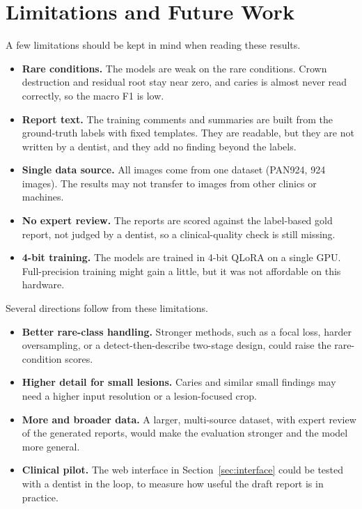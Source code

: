 \documentclass[a4paper,12pt]{report}
\begin{document}
\section{Limitations and Future Work}

A few limitations should be kept in mind when reading these results.

\begin{itemize}
    \item \textbf{Rare conditions.} The models are weak on the rare conditions. Crown destruction and residual root stay near zero, and caries is almost never read correctly, so the macro F1 is low.
    \item \textbf{Report text.} The training comments and summaries are built from the ground-truth labels with fixed templates. They are readable, but they are not written by a dentist, and they add no finding beyond the labels.
    \item \textbf{Single data source.} All images come from one dataset (PAN924, 924 images). The results may not transfer to images from other clinics or machines.
    \item \textbf{No expert review.} The reports are scored against the label-based gold report, not judged by a dentist, so a clinical-quality check is still missing.
    \item \textbf{4-bit training.} The models are trained in 4-bit QLoRA on a single GPU. Full-precision training might gain a little, but it was not affordable on this hardware.
\end{itemize}

Several directions follow from these limitations.

\begin{itemize}
    \item \textbf{Better rare-class handling.} Stronger methods, such as a focal loss, harder oversampling, or a detect-then-describe two-stage design, could raise the rare-condition scores.
    \item \textbf{Higher detail for small lesions.} Caries and similar small findings may need a higher input resolution or a lesion-focused crop.
    \item \textbf{More and broader data.} A larger, multi-source dataset, with expert review of the generated reports, would make the evaluation stronger and the model more general.
    \item \textbf{Clinical pilot.} The web interface in Section~\ref{sec:interface} could be tested with a dentist in the loop, to measure how useful the draft report is in practice.
\end{itemize}
\end{document}
